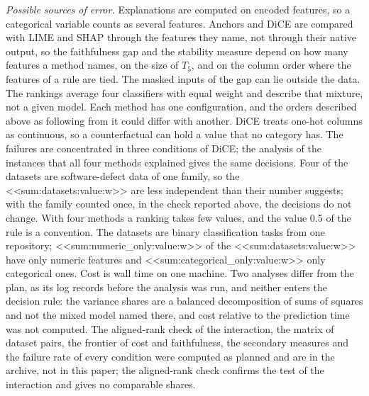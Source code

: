 \documentclass[10pt,a4paper,twocolumn]{article}
\begin{document}
\textit{Possible sources of error.} Explanations are computed on encoded features, so a
categorical variable counts as several features. Anchors and DiCE are compared with LIME
and SHAP through the features they name, not through their native output, so the
faithfulness gap and the stability measure depend on how many features a method names,
on the size of $T_5$, and on the column order where the features of a rule are tied. The masked inputs of the
gap can lie outside the data. The rankings average four classifiers with equal weight
and describe that mixture, not a given model.
Each method has one configuration, and the orders described above as following from it
could differ with another. DiCE treats one-hot columns as continuous, so a counterfactual
can hold a value that no category has. The failures are concentrated in three conditions of DiCE; the analysis of the
instances that all four methods explained gives the same decisions. Four of the datasets
are software-defect data of one family, so the <<sum:datasets:value:w>> are less
independent than their number suggests; with the family counted once, in the check
reported above, the decisions do not change. With four methods a ranking
takes few values, and the value 0.5 of the rule is a convention. The datasets are binary
classification tasks from one repository; <<sum:numeric_only:value:w>> of the
<<sum:datasets:value:w>> have only numeric features and <<sum:categorical_only:value:w>>
only categorical ones. Cost is wall time on one machine. Two analyses differ from the
plan, as its log records before the analysis was run, and neither enters the decision
rule: the variance shares are a balanced decomposition of sums of
squares and not the mixed model named there, and cost relative to the prediction time
was not computed. The aligned-rank check of the interaction, the matrix of dataset pairs,
the frontier of cost and faithfulness, the secondary measures and the failure rate of
every condition were computed as planned and are in the archive, not in this paper; the
aligned-rank check confirms the test of the interaction and gives no comparable shares.
\end{document}
